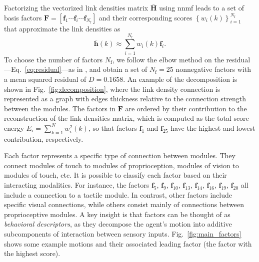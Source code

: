 Factorizing the vectorized link densities matrix $\bar{\bm{H}}$ using \ac{nnmf} leads to a set of basis factors  $\bm{F} = [ \bm{f}_1 \cdots \bm{f}_i \cdots \bm{f}_{N_\text{f}}]$ and their corresponding scores $\left\lbrace w_i(k)\right\rbrace^{N_\text{f}}_{i=1}$ that approximate the link densities as
\begin{equation}
    \bar{\bm{h}}(k)\approx \sum_{i=1}^{N_\text{f}} w_i(k) \bm{f}_i.
    \label{eq:decomposition}
\end{equation}
To choose the number of factors $N_\text{f}$, we follow the elbow method on the residual---Eq.~\eqref{eq:residual}---as in \cite{Phalen2020Nonnegativematrix}, and obtain a set of $N_\text{f} = 25$ nonnegative factors with a mean squared residual of $D=0.1658$.
An example of the decomposition is shown in Fig.~\ref{fig:decomposition}, where the link density connection is represented as a graph with edges thickness relative to the connection strength between the modules. The factors in $\mathbf{F}$ are ordered by their contribution to the reconstruction of the link densities matrix, which is computed as the total score energy $E_i =  \sum_{k=1}^N w_i^2(k)$, so that factors $\bm{f}_1$ and $\bm{f}_{25}$ have the highest and lowest contribution, respectively.

Each factor represents a specific type of connection between modules. They connect modules of touch to modules of proprioception, modules of vision to modules of touch, etc. It is possible to classify each factor based on their interacting modalities. For instance, the factors $\bm{f}_5$, $\bm{f}_9$, $\bm{f}_{10}$, $\bm{f}_{13}$, $\bm{f}_{14}$, $\bm{f}_{16}$, $\bm{f}_{19}$, $\bm{f}_{20}$ all include a connection to a tactile module. In contrast, other factors include specific visual connections, while others consist mainly of connections between proprioceptive modules. A key insight is that factors can be thought of as \emph{behavioral descriptors}, as they decompose the agent's motion into additive subcomponents of interaction between sensory inputs. %
Fig.~\ref{fig:main_factors} shows some example motions and their associated leading factor (the factor with the highest score). 

